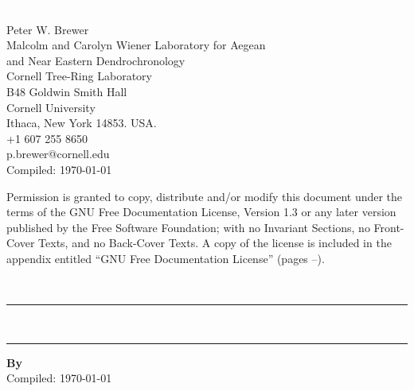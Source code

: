 


\thispagestyle{empty} 
\includegraphics{Images/pixel.png}
\vfill
\parbox[b]{11cm}{\raggedright

\textcopyright {\the\year} Peter W. Brewer\\[2mm] Malcolm and Carolyn Wiener Laboratory for Aegean\\ and Near Eastern Dendrochronology \\
Cornell Tree-Ring Laboratory\\
B48 Goldwin Smith Hall\\ Cornell University \\ Ithaca, New York 14853. USA.\\[0.5cm] \Telefon\hspace{3mm}+1 607 255 8650 \\ \Letter\hspace{3mm}p.brewer@cornell.edu\\[5mm] Compiled: \today\\[10mm]}

{\footnotesize 
Permission is granted to copy, distribute and/or modify this document
under the terms of the GNU Free Documentation License, Version 1.3
or any later version published by the Free Software Foundation;
with no Invariant Sections, no Front-Cover Texts, and no Back-Cover Texts.
A copy of the license is included in the appendix entitled ``GNU Free Documentation License'' (pages \pageref{txt:FDLStart}--\pageref{txt:FDLEnd}).}



\newpage
{}
\setcounter{page}{1}
\thispagestyle{empty} 
{ \includegraphics{Images/pixel.png}\\[4cm] 
\hrule 
\vspace{5mm}
\Huge \bfseries \thetitle\\[3mm] 
\large{\thesubtitle}
\vspace{5mm}
\hrule
\vspace{3cm}
}
{
\normalsize
\textbf{By \authornames}\\[0.6cm]
}
{
\vfill
\footnotesize
Compiled: \today
}

\newpage


\tableofcontents


\cleardoublepage
{} 

